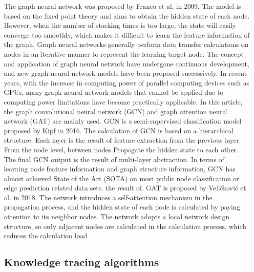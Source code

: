 The graph neural network was proposed by Franco et al. in 2009. The model is based on the fixed point theory and aims to obtain the hidden state of each node. However, when the number of stacking times is too large, the state will easily converge too smoothly, which makes it difficult to learn the feature information of the graph. Graph neural networks generally perform data transfer calculations on nodes in an iterative manner to represent the learning target node. The concept and application of graph neural network have undergone continuous development, and new graph neural network models have been proposed successively. In recent years, with the increase in computing power of parallel computing devices such as GPUs, many graph neural network models that cannot be applied due to computing power limitations have become practically applicable. In this article, the graph convolutional neural network (GCN) and graph attention neural network (GAT) are mainly used. GCN is a semi-supervised classification model proposed by Kipf in 2016\cite{kipf2016semi}. The calculation of GCN is based on a hierarchical structure. Each layer is the result of feature extraction from the previous layer. From the node level, between nodes Propagate the hidden state to each other. The final GCN output is the result of multi-layer abstraction. In terms of learning node feature information and graph structure information, GCN has almost achieved State of the Art (SOTA) on most public node classification or edge prediction related data sets. the result of. GAT is proposed by Veličković et al. in 2018\cite{veli2018graph}. The network introduces a self-attention mechanism in the propagation process, and the hidden state of each node is calculated by paying attention to its neighbor nodes. The network adopts a local network design structure, so only adjacent nodes are calculated in the calculation process, which reduces the calculation load.

\subsection{Knowledge tracing algorithms}

